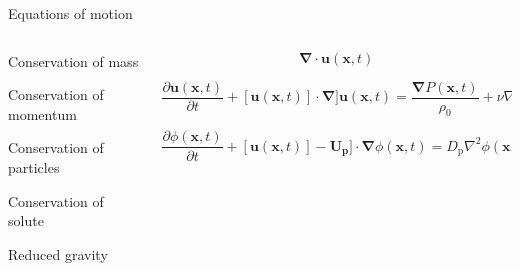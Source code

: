 \documentclass[final]{beamer} %
\begin{document}
\begin{frame}[t]
\begin{columns}[t]
\begin{column}{0.6\paperwidth}
      \begin{columns}[t]
        \begin{column}{0.43\paperwidth}

          \begin{block}{Equations of motion}

            \begin{columns}[t]

              \begin{column}{0.13\paperwidth}

                \centering

                Conservation of mass \\

                \vspace{1.75cm}

                Conservation of momentum \\

                \vspace{1.75cm}

                Conservation of particles \\

                \vspace{1.75cm}

                Conservation of solute \\

                \vspace{1.75cm}

                Reduced gravity 

              \end{column}

              \begin{column}{0.3\paperwidth}
                $$ \mathbf{\nabla} \cdot \mathbf{u}(\mathbf{x}, t) $$

                $$ \frac{\partial \mathbf{u}(\mathbf{x}, t)}{\partial t} +
                [\mathbf{u}(\mathbf{x}, t)] \cdot \mathbf{\nabla}]
                  \mathbf{u}(\mathbf{x}, t) =
                  \frac{\mathbf{\nabla} P(\mathbf{x}, t)}{\rho_{0}} +
                  \nu \nabla^{2} \mathbf{u}(\mathbf{x}, t) - g'\mathbf{\hat{z}} $$

                  $$ \frac{\partial \phi(\mathbf{x}, t)}{\partial t} +
                  [\mathbf{u}(\mathbf{x}, t)] - \mathbf{U_{\text{p}}}] \cdot
                    \mathbf{\nabla} \phi(\mathbf{x}, t) =
                    D_{\text{p}} \nabla^{2} \phi(\mathbf{x}, t) $$
                    

\end{column}
\end{columns}
\end{block}
\end{column}
\end{columns}
\end{column}
\end{columns}
\end{frame}
\end{document}
